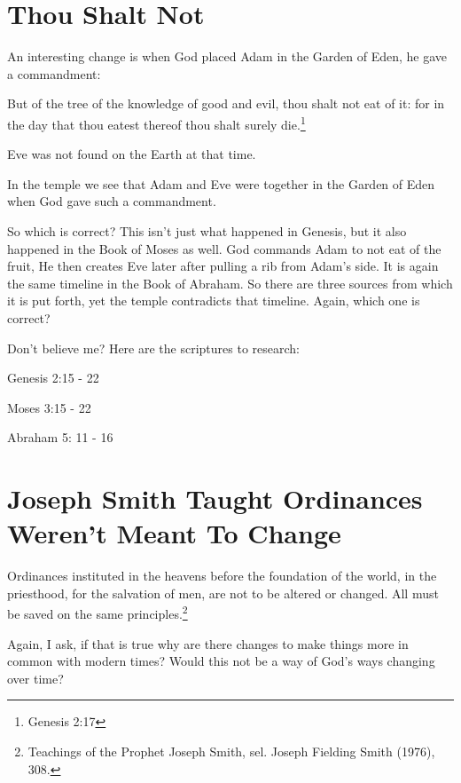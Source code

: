 \section{Thou Shalt Not}

An interesting change is when God placed Adam in the Garden of Eden, he gave a
commandment:

\begin{displayquote}
But of the tree of the knowledge of good and evil, thou shalt not eat of it: 
for in the day that thou eatest thereof thou shalt surely 
die.\footnote{Genesis 2:17}
\end{displayquote}

Eve was not found on the Earth at that time.

In the temple we see that Adam and Eve were together in the Garden of Eden when
God gave such a commandment.

So which is correct? This isn't just what happened in Genesis, but it also
happened in the Book of Moses as well. God commands Adam to not eat of the
fruit, He then creates Eve later after pulling a rib from Adam's side. It is
again the same timeline in the Book of Abraham. So there are three sources from
which it is put forth, yet the temple contradicts that timeline. Again, which
one is correct?

Don't believe me? Here are the scriptures to research:

\begin{displayquote}
Genesis 2:15 - 22

Moses 3:15 - 22

Abraham 5: 11 - 16
\end{displayquote}

\section{Joseph Smith Taught Ordinances Weren't Meant To Change}

\begin{displayquote}
Ordinances instituted in the heavens before the foundation of the world, in the 
priesthood, for the salvation of men, are not to be altered or changed. All must 
be saved on the same principles.\footnote{Teachings of the Prophet Joseph Smith, 
sel. Joseph Fielding Smith (1976), 308.}
\end{displayquote}

Again, I ask, if that is true why are there changes to make things more in common
with modern times? Would this not be a way of God's ways changing over time?